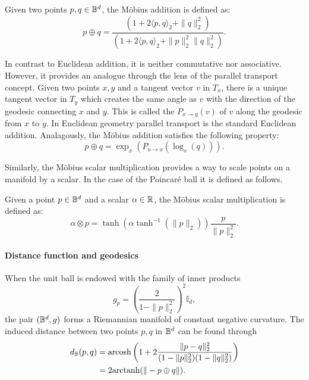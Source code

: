 \begin{definition}
    Given two points $p,q\in\mathbb{B}^d$, the Möbius addition is defined as:
    \begin{equation*}
        p \oplus q = \frac{(1 +  2\langle p,q\rangle_2 + \|q\|^2_2)}{(1 + 2\langle p,q\rangle_2 + \|p\|^2_2\|q\|^2_2)}.
    \end{equation*}
    
\end{definition}

In contrast to Euclidean addition, it is neither commutative nor associative. However, it provides an analogue through the lens of the parallel transport concept. Given two points $x,y$ and a tangent vector $v$ in $T_x$, there is a unique tangent vector in $T_y$ which creates the same angle as $v$ with the direction of the geodesic connecting $x$ and $y$. This is called the  $P_{x\to y} (v)$ of $v$ along the geodesic from $x$ to $y$. In Euclidean geometry parallel transport is the standard Euclidean addition. Analagously, the Möbius addition satisfies the following property:
\begin{equation*}
    p\oplus q=\exp_{x}(P_{o\to x}(\log_o(q))).
\end{equation*}

Similarly, the Möbius scalar multiplication provides a way to scale points on a manifold by a scalar. In the case of the Poincaré ball it is defined as follows.

\begin{definition}
    Given a point $p\in\mathbb{B}^d$ and a scalar $\alpha\in\mathbb{R}$, the Möbius scalar multiplication is defined as:
    \begin{equation*}
        \alpha \otimes p = \tanh({\alpha \tanh^{-1}(\|p\|_2)})\frac{p}{\|p\|^2_2}.
    \end{equation*}
\end{definition}

\paragraph{Distance function and geodesics}
When the unit ball is endowed with the family of inner products
\begin{equation*}
    g_p = \left(\frac{2}{1-\|p\|^2_2}\right)^2\mathbb{I}_d,
\end{equation*}
the pair $(\mathbb{B}^d,g)$ forms a Riemannian manifold of constant negative curvature. The induced distance between two points $p,q$ in $\mathbb{B}^d$ can be found through
\begin{align}\label{eq:poincareDistance}
    d_{\mathbb{B}}(p,q) &= \text{arcosh}\left(1 + 2\frac{\|p-q\|^2_2}{(1-\|p\|^2_2)(1-\|q\|^2_2)}\right)\\
              &= 2\text{arctanh}(\|-p\oplus q\|).
\end{align}

